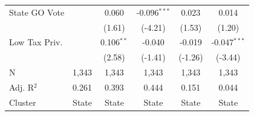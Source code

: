 \begin{tabular*}{\textwidth}{@{\extracolsep{\fill}}lccccc}
   State GO Vote        &                & 0.060          & -0.096$^{***}$ & 0.023          & 0.014\\   
                        &                & (1.61)        & (-4.21)       & (1.53)        & (1.20)\\   
   Low Tax Priv.        &                & 0.106$^{**}$   & -0.040         & -0.019         & -0.047$^{***}$\\   
                        &                & (2.58)        & (-1.41)       & (-1.26)       & (-3.44)\\   
   \hline
   N         & 1,343          & 1,343          & 1,343          & 1,343          & 1,343\\  
   Adj. R$^2$       & 0.261          & 0.393          & 0.444          & 0.151          & 0.044\\  
   Cluster              & State & State & State & State & State\\  
   \bottomrule
\end{tabular*}
\par\endgroup
